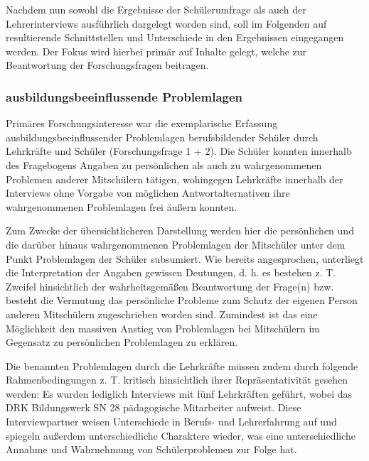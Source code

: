 Nachdem nun sowohl die Ergebnisse der Schülerumfrage als auch der Lehrerinterviews ausführlich dargelegt worden sind, soll im Folgenden auf resultierende Schnittstellen und Unterschiede in den Ergebnissen eingegangen werden. Der Fokus wird hierbei primär auf Inhalte gelegt, welche zur Beantwortung der Forschungsfragen beitragen.\\

\subsubsection{ausbildungsbeeinflussende Problemlagen}
\label{sec:ausbildungsbeeinflussendeProblemlagen}

Primäres Forschungsinteresse war die exemplarische Erfassung ausbildungsbeeinflussender Problemlagen berufsbildender Schüler durch Lehrkräfte und Schüler (Forschungsfrage 1 + 2). Die Schüler konnten innerhalb des Fragebogens Angaben zu persönlichen als auch zu wahrgenommenen Problemen anderer Mitschülern tätigen, wohingegen Lehrkräfte innerhalb der Interviews ohne Vorgabe von möglichen Antwortalternativen ihre wahrgenommenen Problemlagen frei äußern konnten.

Zum Zwecke der übersichtlicheren Darstellung werden hier die persönlichen und die darüber hinaus wahrgenommenen Problemlagen der Mitschüler unter dem Punkt Problemlagen der Schüler subsumiert. Wie bereits angesprochen, unterliegt die Interpretation der Angaben gewissen Deutungen, d. h. es bestehen z. T. Zweifel hinsichtlich der wahrheitsgemäßen Beantwortung der Frage(n) bzw. besteht die Vermutung das persönliche Probleme zum Schutz der eigenen Person anderen Mitschülern zugeschrieben worden sind. Zumindest ist das eine Möglichkeit den massiven Anstieg von Problemlagen bei Mitschülern im Gegensatz zu persönlichen Problemlagen zu erklären.

Die benannten Problemlagen durch die Lehrkräfte müssen zudem durch folgende Rahmenbedingungen z. T. kritisch hinsichtlich ihrer Repräsentativität gesehen werden: Es wurden lediglich Interviews mit fünf Lehrkräften geführt, wobei das DRK Bildungswerk SN 28 pädagogische Mitarbeiter aufweist. Diese Interviewpartner weisen Unterschiede in Berufs- und Lehrerfahrung auf und spiegeln außerdem unterschiedliche Charaktere wieder, was eine unterschiedliche Annahme und Wahrnehmung von Schülerproblemen zur Folge hat.\\

